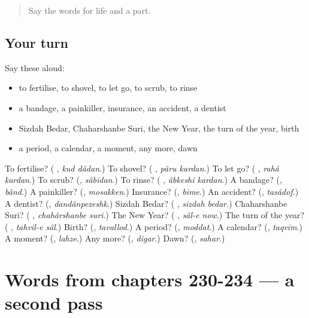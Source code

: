 \begin{quote}
Say the words for life and a part.
\end{quote}

\subsection*{Your turn}
Say these aloud:

\begin{itemize}
\raggedright
  \item to fertilise, to shovel, to let go, to scrub, to rinse
  \item a bandage, a painkiller, insurance, an accident, a dentist
  \item Sizdah Bedar, Chaharshanbe Suri, the New Year, the turn of the year, birth
  \item a period, a calendar, a moment, any more, dawn
\end{itemize}

\begin{tcolorbox}[breakable,colback=teal!4,colframe=teal!35!black,title={Before you move on}]
To fertilise? (\textbf{ }, \emph{kud dâdan}.) To shovel? (\textbf{ }, \emph{pâru kardan}.) To let go? (\textbf{ }, \emph{rahâ kardan}.) To scrub? (\textbf{}, \emph{sâbidan}.) To rinse? (\textbf{ }, \emph{âbkeshi kardan}.) A bandage? (\textbf{}, \emph{bând}.) A painkiller? (\textbf{}, \emph{mosakken}.) Insurance? (\textbf{}, \emph{bime}.) An accident? (\textbf{}, \emph{tasâdof}.) A dentist? (\textbf{}, \emph{dandânpezeshk}.) Sizdah Bedar? (\textbf{ }, \emph{sizdah bedar}.) Chaharshanbe Suri? (\textbf{ }, \emph{chahârshanbe suri}.) The New Year? (\textbf{ }, \emph{sâl-e now}.) The turn of the year? (\textbf{ }, \emph{tahvil-e sâl}.) Birth? (\textbf{}, \emph{tavallod}.) A period? (\textbf{}, \emph{moddat}.) A calendar? (\textbf{}, \emph{taqvim}.) A moment? (\textbf{}, \emph{lahze}.) Any more? (\textbf{}, \emph{digar}.) Dawn? (\textbf{}, \emph{sahar}.)
\end{tcolorbox}
\section[(dialogue)]{Words from chapters 230-234 — a second pass}

\label{lesson:FA-R234-second-pass-words-from-chapters-230-234}



